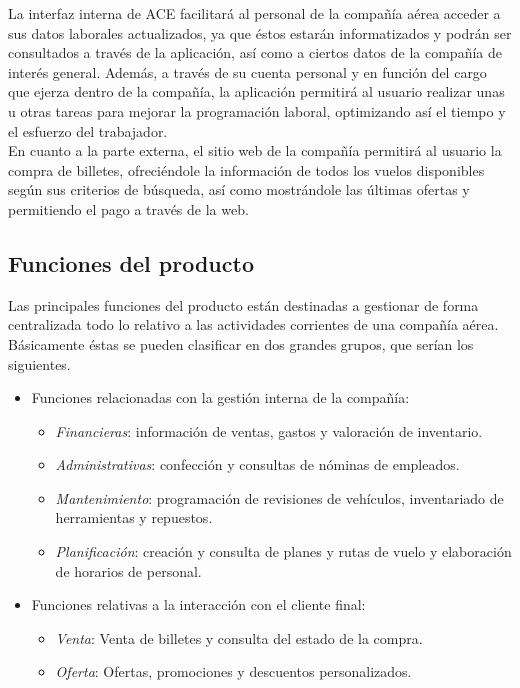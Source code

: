\documentclass[11pt, a4paper, twoside, titlepage]{article}
\begin{document}
			La interfaz interna de ACE facilitará al personal de la compañía aérea acceder a sus datos laborales actualizados, ya que éstos estarán informatizados y podrán ser consultados a través de la aplicación, así como a ciertos datos de la compañía de interés general. Además, a través de su cuenta personal y en función del cargo que ejerza dentro de la compañía, la aplicación permitirá al usuario realizar unas u otras tareas para mejorar la programación laboral, optimizando así el tiempo y el esfuerzo del trabajador. \\
			
			En cuanto a la parte externa, el sitio web de la compañía permitirá al usuario la compra de billetes, ofreciéndole la información de todos los vuelos disponibles según sus criterios de búsqueda, así como mostrándole las últimas ofertas y permitiendo el pago a través de la web.
			
		\subsection{Funciones del producto}
			Las principales funciones del producto están destinadas a gestionar de forma centralizada todo lo relativo a las actividades corrientes de una compañía aérea. Básicamente éstas se pueden clasificar en dos grandes grupos, que serían los siguientes. \\
			
			\begin{itemize}
				\item Funciones relacionadas con la gestión interna de la compañía:
					\begin{itemize}
						\item \textit{Financieras}: información de ventas, gastos y valoración de inventario.
						\item \textit{Administrativas}: confección y consultas de nóminas de empleados.
						\item \textit{Mantenimiento}: programación de revisiones de vehículos, inventariado de herramientas y repuestos.
						\item \textit{Planificación}: creación y consulta de planes y rutas de vuelo y elaboración de horarios de personal.
					\end{itemize}
				\item Funciones relativas a la interacción con el cliente final:
					\begin{itemize}
						\item \textit{Venta}: Venta de billetes y consulta del estado de la compra.
						\item \textit{Oferta}: Ofertas, promociones y descuentos personalizados.
					\end{itemize}
			\end{itemize}
			
\end{document}
